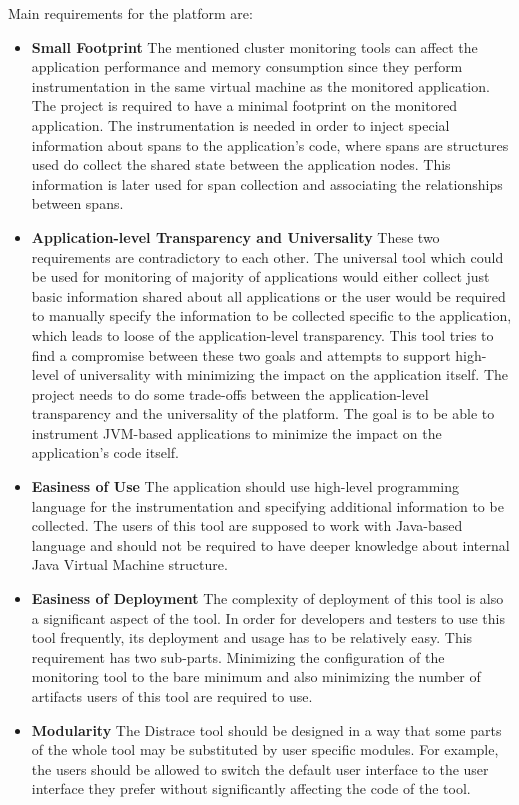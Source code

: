 Main requirements for the platform are:
\begin{itemize}
	\item \textbf{Small Footprint} \newline
	 The mentioned cluster monitoring tools can affect the application performance and memory consumption since they perform instrumentation in the same virtual machine as the monitored application. The project is required to have a minimal footprint on the monitored application. The instrumentation is needed in order to inject special information about spans to the application's code, where spans are structures used do collect the shared state between the application nodes. This information is later used for span collection and associating the relationships between spans.
	\item \textbf{Application-level Transparency and Universality} \newline
	These two requirements are contradictory to each other. The universal tool which could be used for monitoring of majority of applications would either collect just basic information shared about all applications or the user would be required to manually specify the information to be collected specific to the application, which leads to loose of the application-level transparency. This tool tries to find a compromise between these two goals and attempts to support high-level of universality with minimizing the impact on the application itself.
	The project needs to do some trade-offs between the application-level transparency and the universality of the platform. The goal is to be able to instrument JVM-based applications to minimize the impact on the application's code itself.
	\item \textbf{Easiness of Use} \newline
	The application should use high-level programming language for the instrumentation and specifying additional information to be collected. The users of this tool are supposed to work with Java-based language and should not be required to have deeper knowledge about internal Java Virtual Machine structure.
	\item \textbf{Easiness of Deployment} \newline
	The complexity of deployment of this tool is also a significant aspect of the tool. In order for developers and testers to use this tool frequently, its deployment and usage has to be relatively easy. This requirement has two sub-parts. Minimizing the configuration of the monitoring tool to the bare minimum and also minimizing the number of artifacts users of this tool are required to use.
	\item \textbf{Modularity} \newline
	The Distrace tool should be designed in a way that some parts of the whole tool may be substituted by user specific modules. For example, the users should be allowed to switch the default user interface to the user interface they prefer without significantly affecting the code of the tool.
\end{itemize}

